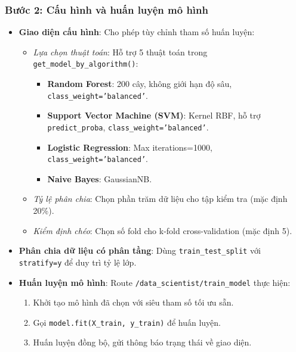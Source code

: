 ﻿\documentclass{article}
\begin{document}
\subsubsection{Bước 2: Cấu hình và huấn luyện mô hình}
\begin{itemize}
    \item \textbf{Giao diện cấu hình}: Cho phép tùy chỉnh tham số huấn luyện:
    \begin{itemize}
        \item \textit{Lựa chọn thuật toán}: Hỗ trợ 5 thuật toán trong \texttt{get\_model\_by\_algorithm()}:
        \begin{itemize}
            \item \textbf{Random Forest}: 200 cây, không giới hạn độ sâu, \texttt{class\_weight='balanced'}.
            \item \textbf{Support Vector Machine (SVM)}: Kernel RBF, hỗ trợ \texttt{predict\_proba}, \texttt{class\_weight='balanced'}.
            \item \textbf{Logistic Regression}: Max iterations=1000, \texttt{class\_weight='balanced'}.
            \item \textbf{Naive Bayes}: GaussianNB.
        \end{itemize}
        \item \textit{Tỷ lệ phân chia}: Chọn phần trăm dữ liệu cho tập kiểm tra (mặc định 20\%).
        \item \textit{Kiểm định chéo}: Chọn số fold cho k-fold cross-validation (mặc định 5).
    \end{itemize}
    
    \item \textbf{Phân chia dữ liệu có phân tầng}: Dùng \texttt{train\_test\_split} với \texttt{stratify=y} để duy trì tỷ lệ lớp.
    
    \item \textbf{Huấn luyện mô hình}: Route \texttt{/data\_scientist/train\_model} thực hiện:
    \begin{enumerate}
        \item Khởi tạo mô hình đã chọn với siêu tham số tối ưu sẵn.
        \item Gọi \texttt{model.fit(X\_train, y\_train)} để huấn luyện.
        \item Huấn luyện đồng bộ, gửi thông báo trạng thái về giao diện.
    \end{enumerate}
\end{itemize}
\end{document}
